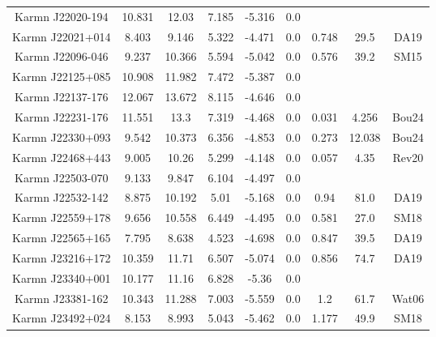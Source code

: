 \begin{longtable}{ccccccccc}
    Karmn J22020-194 & 10.831 & 12.03 & 7.185 & -5.316 & 0.0 &  &  &  \\
    Karmn J22021+014 & 8.403 & 9.146 & 5.322 & -4.471 & 0.0 & 0.748 & 29.5 & DA19 \\
    Karmn J22096-046 & 9.237 & 10.366 & 5.594 & -5.042 & 0.0 & 0.576 & 39.2 & SM15 \\
    Karmn J22125+085 & 10.908 & 11.982 & 7.472 & -5.387 & 0.0 &  &  &  \\
    Karmn J22137-176 & 12.067 & 13.672 & 8.115 & -4.646 & 0.0 &  &  &  \\
    Karmn J22231-176 & 11.551 & 13.3 & 7.319 & -4.468 & 0.0 & 0.031 & 4.256 & Bou24 \\
    Karmn J22330+093 & 9.542 & 10.373 & 6.356 & -4.853 & 0.0 & 0.273 & 12.038 & Bou24 \\
    Karmn J22468+443 & 9.005 & 10.26 & 5.299 & -4.148 & 0.0 & 0.057 & 4.35 & Rev20 \\
    Karmn J22503-070 & 9.133 & 9.847 & 6.104 & -4.497 & 0.0 &  &  &  \\
    Karmn J22532-142 & 8.875 & 10.192 & 5.01 & -5.168 & 0.0 & 0.94 & 81.0 & DA19 \\
    Karmn J22559+178 & 9.656 & 10.558 & 6.449 & -4.495 & 0.0 & 0.581 & 27.0 & SM18 \\
    Karmn J22565+165 & 7.795 & 8.638 & 4.523 & -4.698 & 0.0 & 0.847 & 39.5 & DA19 \\
    Karmn J23216+172 & 10.359 & 11.71 & 6.507 & -5.074 & 0.0 & 0.856 & 74.7 & DA19 \\
    Karmn J23340+001 & 10.177 & 11.16 & 6.828 & -5.36 & 0.0 &  &  &  \\
    Karmn J23381-162 & 10.343 & 11.288 & 7.003 & -5.559 & 0.0 & 1.2 & 61.7 & Wat06 \\
    Karmn J23492+024 & 8.153 & 8.993 & 5.043 & -5.462 & 0.0 & 1.177 & 49.9 & SM18 \\

\end{longtable}
